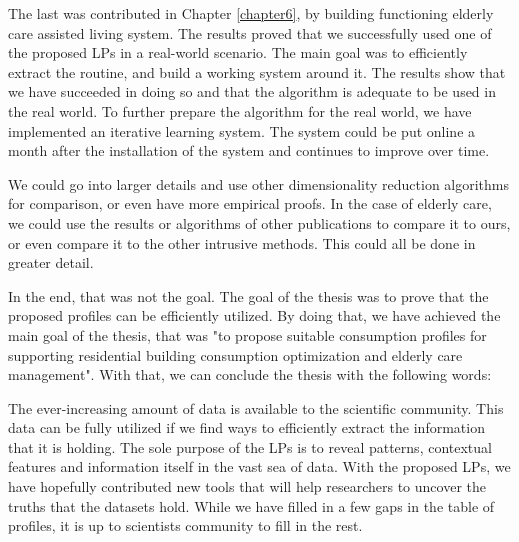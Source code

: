The last was contributed in Chapter \ref{chapter6}, by building functioning elderly care assisted living system. 
The results proved that we successfully used one of the proposed LPs in a real-world scenario. 
The main goal was to efficiently extract the routine, and build a working system around it.
The results show that we have succeeded in doing so and that the algorithm is adequate to be used in the real world.
To further prepare the algorithm for the real world, we have implemented an iterative learning system.
The system could be put online a month after the installation of the system and continues to improve over time.

We could go into larger details and use other dimensionality reduction algorithms for comparison, or even have more empirical proofs. 
In the case of elderly care, we could use the results or algorithms of other publications to compare it to ours, or even compare it to the other intrusive methods. 
This could all be done in greater detail.

In the end, that was not the goal.
The goal of the thesis was to prove that the proposed profiles can be efficiently utilized. 
By doing that, we have achieved the main goal of the thesis,
that was "to propose suitable consumption profiles for supporting residential building consumption optimization and elderly care management".
With that, we can conclude the thesis with the following words:

The ever-increasing amount of data is available to the scientific community.
This data can be fully utilized if we find ways to efficiently extract the information that it is holding.
The sole purpose of the LPs is to reveal patterns, contextual features and information itself in the vast sea of data.
With the proposed LPs, we have hopefully contributed new tools that will help researchers to uncover the truths that the datasets hold. 
While we have filled in a few gaps in the table of profiles, it is up to scientists community to fill in the rest.